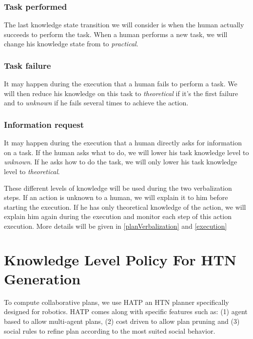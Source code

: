 \documentclass{llncs}
\begin{document}
\subsubsection{Task performed}
The last knowledge state transition we will consider is when the human actually succeeds to perform the task. When a human performs a new task, we will change his knowledge state from to \textit{practical}.


\subsubsection{Task failure}
It may happen during the execution that a human fails to perform a task.
We will then reduce his knowledge on this task to \textit{theoretical} if it's the first failure and to \textit{unknown} if he fails several times to achieve the action.

\subsubsection{Information request}
It may happen during the execution that a human directly asks for information on a task.
If the human asks what to do, we will lower his task knowledge level to \textit{unknown}. If he asks how to do the task, we will only lower his task knowledge level to \textit{theoretical}.

These different levels of knowledge will be used during the two verbalization steps. If an action is unknown to a human, we will explain it to him before starting the execution. If he has only theoretical knowledge of the action, we will explain him again during the execution and monitor each step of this action execution. More details will be given in \ref{planVerbalization} and \ref{execution}



\section{Knowledge Level Policy For HTN Generation}
\label{planning}
To compute collaborative plans, we use HATP \cite{lallement14} an HTN planner specifically designed for robotics. 
HATP comes along with specific features such as: (1) agent based to allow multi-agent plans, (2) cost driven to allow plan pruning and (3) social rules to refine plan according to the most suited social behavior.
\end{document}
